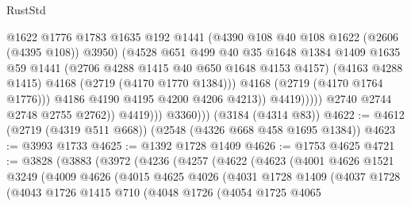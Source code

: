 \begin{lexlean}{RustStd}
\begin{coremodule}
                                    @1622
                                    @1776
                                    @1783
                                    @1635
                                    @192
                                    @1441
                                    (@4390 @108 @40 @108 @1622 (@2606 (@4395 @108)) @3950)
                                    (@4528
                                      @651
                                      @499
                                      @40
                                      @35
                                      @1648
                                      @1384
                                      @1409
                                      @1635
                                      @59
                                      @1441
                                      (@2706 @4288 @1415 @40 @650 @1648 @4153 @4157)
                                      (@4163 @4288 @1415)
                                      @4168
                                      (@2719 (@4170 @1770 @1384)))
                                    @4168
                                    (@2719 (@4170 @1764 @1776)))
                                  @4186
                                  @4190
                                  @4195
                                  @4200
                                  @4206
                                  @4213))
                              @4419)))))
                    @2740
                    @2744
                    @2748
                    @2755
                    @2762))
                @4419)))
          @3360)))
    (@3184 (@4314 @83))
@4622 := @4612 (@2719 (@4319 @511 @668)) (@2548 (@4326 @668 @458 @1695 @1384))
@4623 := @3993 @1733
@4625 := @1392 @1728 @1409
@4626 := @1753 @4625
@4721 := @3828
    (@3883
      (@3972
        (@4236
          (@4257
            (@4622
              (@4623
                (@4001
                  @4626
                  @1521
                  @3249
                  (@4009
                    @4626
                    (@4015
                      @4625
                      @4026
                      (@4031
                        @1728
                        @1409
                        (@4037
                          @1728
                          (@4043
                            @1726
                            @1415
                            @710
                            (@4048
                              @1726
                              (@4054
                                @1725
                                @4065

\end{coremodule}
\end{lexlean}
